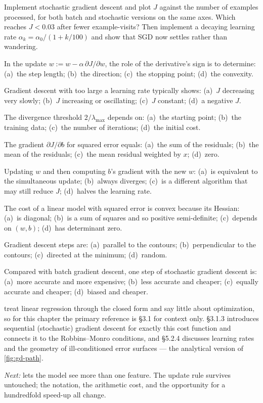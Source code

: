 \pe Implement stochastic gradient descent and plot $J$ against the number of
examples processed, for both batch and stochastic versions on the same axes.
Which reaches $J < 0.03$ after fewer example-visits? Then implement a decaying
learning rate $\alpha_k = \alpha_0/(1+k/100)$ and show that SGD now settles
rather than wandering.


\qz In the update $w := w - \alpha\,\partial J/\partial w$, the role of the
derivative's sign is to determine: (a)~the step length; (b)~the direction;
(c)~the stopping point; (d)~the convexity.

\qz Gradient descent with too large a learning rate typically shows:
(a)~$J$ decreasing very slowly; (b)~$J$ increasing or oscillating;
(c)~$J$ constant; (d)~a negative $J$.

\qz The divergence threshold $2/\lambda_{\max}$ depends on: (a)~the starting
point; (b)~the training data; (c)~the number of iterations; (d)~the initial
cost.

\qz The gradient $\partial J/\partial b$ for squared error equals: (a)~the sum
of the residuals; (b)~the mean of the residuals; (c)~the mean residual weighted
by $x$; (d)~zero.

\qz Updating $w$ and then computing $b$'s gradient with the new $w$: (a)~is
equivalent to the simultaneous update; (b)~always diverges; (c)~is a different
algorithm that may still reduce $J$; (d)~halves the learning rate.

\qz The cost of a linear model with squared error is convex because its Hessian:
(a)~is diagonal; (b)~is a sum of squares and so positive semi-definite;
(c)~depends on $(w,b)$; (d)~has determinant zero.

\qz Gradient descent steps are: (a)~parallel to the contours; (b)~perpendicular
to the contours; (c)~directed at the minimum; (d)~random.

\qz Compared with batch gradient descent, one step of stochastic gradient
descent is: (a)~more accurate and more expensive; (b)~less accurate and cheaper;
(c)~equally accurate and cheaper; (d)~biased and cheaper.

\furtherreading

\textcite{james2021} treat linear regression through the closed form and say
little about optimization, so for this chapter the primary reference is
§3.1 for context only. \textcite{bishop2006} §3.1.3 introduces sequential
(stochastic) gradient descent for exactly this cost function and connects it to
the Robbins--Monro conditions, and §5.2.4 discusses learning rates and the
geometry of ill-conditioned error surfaces --- the analytical version of
\cref{fig:gd-path}.

\bigskip
\noindent\emph{Next:}  lets the model see more than one feature.
The update rule survives untouched; the notation, the arithmetic cost, and the
opportunity for a hundredfold speed-up all change.
